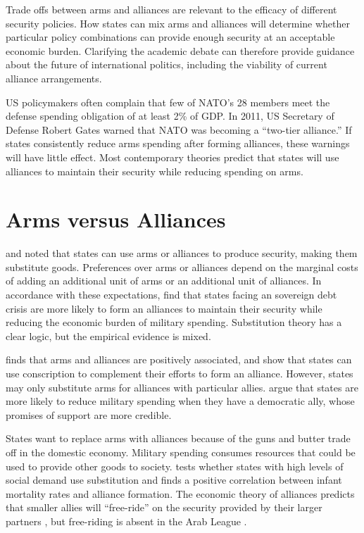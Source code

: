 \documentclass[12pt]{article}
\begin{document}
Trade offs between arms and alliances are relevant to the efficacy of different security policies. How states can mix arms and alliances will determine whether particular policy combinations can provide enough security at an acceptable economic burden. Clarifying the academic debate can therefore provide guidance about the future of international politics, including the viability of current alliance arrangements. 

US policymakers often complain that few of NATO's 28 members meet the defense spending obligation of at least 2\% of GDP. In 2011, US Secretary of Defense Robert Gates warned that NATO was becoming a ``two-tier alliance.'' If states consistently reduce arms spending after forming alliances, these warnings will have little effect. Most contemporary theories predict that states will use alliances to maintain their security while reducing spending on arms. 


\section*{Arms versus Alliances}


\citet{Altfield1984} and \citet{Morrow1993} noted that states can use arms or alliances to produce security, making them substitute goods. Preferences over arms or alliances depend on the marginal costs of adding an additional unit of arms or an additional unit of alliances. In accordance with these expectations, \citet{AllenDigiuseppe2013} find that states facing an sovereign debt crisis are more likely to form an alliances to maintain their security while reducing the economic burden of military spending. Substitution theory has a clear logic, but the empirical evidence is mixed. 

\citet{Diehl1994} finds that arms and alliances are positively associated, and \citet{Horowitzetal2017} show that states can use conscription to complement their efforts to form an alliance. However, states may only substitute arms for alliances with particular allies. \citet{DigiuseppePoast2016} argue that states are more likely to reduce military spending when they have a democratic ally, whose promises of support are more credible. 

States want to replace arms with alliances because of the guns and butter trade off in the domestic economy. Military spending consumes resources that could be used to provide other goods to society. \citet{Kimball2010} tests whether states with high levels of social demand use substitution and finds a positive correlation between infant mortality rates and alliance formation. The economic theory of alliances predicts that smaller allies will ``free-ride'' on the security provided by their larger partners \citep{SandlerHartley2001, Lake2009}, but free-riding is absent in the Arab League \citep{Chenetal1996}. 
\end{document}
